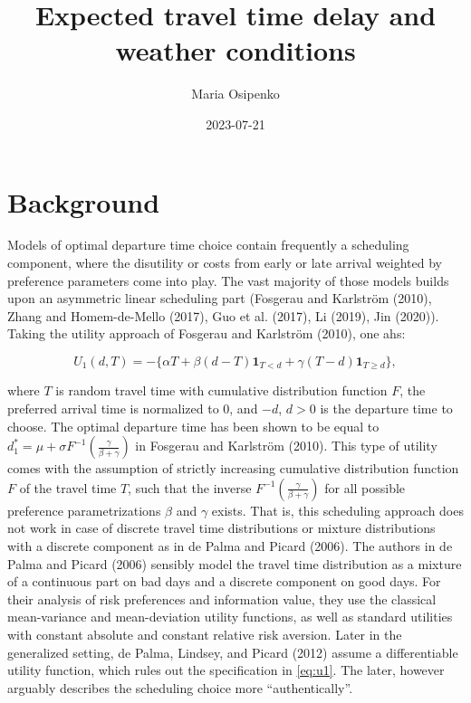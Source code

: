 \documentclass[
]{article}
\title{Expected travel time delay and weather conditions}
\author{Maria Osipenko}
\date{2023-07-21}
\theoremstyle{definition}
\theoremstyle{definition}
\theoremstyle{definition}
\theoremstyle{definition}
\theoremstyle{remark}
\begin{document}
\maketitle

\hypertarget{background}{%
\section{Background}\label{background}}

Models of optimal departure time choice contain frequently a scheduling component, where the disutility or costs from early or late arrival weighted by preference parameters come into play. The vast majority of those models builds upon an asymmetric linear scheduling part (Fosgerau and Karlström (2010), Zhang and Homem-de-Mello (2017), Guo et al. (2017), Li (2019), Jin (2020)). Taking the utility approach of Fosgerau and Karlström (2010), one ahs:

\begin{equation}U_1(d,T) = -\{\alpha T + \beta(d-T)\mathbf 1_{T<d} + \gamma (T-d)\mathbf 1_{T\geq d}\}, \label{eq:u1}
\end{equation}

where \(T\) is random travel time with cumulative distribution function \(F\), the preferred arrival time is normalized to \(0\), and \(-d\), \(d>0\) is the departure time to choose.
The optimal departure time has been shown to be equal to \(d_1^* = \mu + \sigma F^{-1}\left(\frac{\gamma}{\beta+\gamma}\right)\) in Fosgerau and Karlström (2010). This type of utility comes with the assumption of strictly increasing cumulative distribution function \(F\) of the travel time \(T\), such that the inverse \(F^{-1}\left(\frac{\gamma}{\beta+\gamma}\right)\) for all possible preference parametrizations \(\beta\) and \(\gamma\) exists. That is, this scheduling approach does not work in case of discrete travel time distributions or mixture distributions with a discrete component as in de Palma and Picard (2006). The authors in de Palma and Picard (2006) sensibly model the travel time distribution as a mixture of a continuous part on bad days and a discrete component on good days. For their analysis of risk preferences and information value, they use the classical mean-variance and mean-deviation utility functions, as well as standard utilities with constant absolute and constant relative risk aversion. Later in the generalized setting, de Palma, Lindsey, and Picard (2012) assume a differentiable utility function, which rules out the specification in \eqref{eq:u1}. The later, however arguably describes the scheduling choice more ``authentically''.
\end{document}
